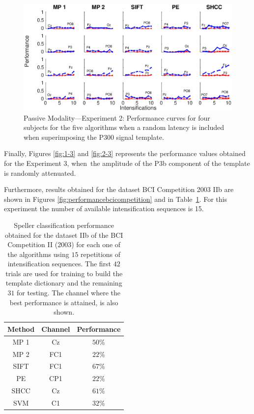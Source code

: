 \documentclass[brainsci,article,accept,moreauthors,pdftex,10pt,a4paper]{mdpi}
\begin{document}
\begin{figure}[H]
\centering
\includegraphics[width=16cm]{images/1-2.eps}
\caption{{Passive Modality---Experiment 2}: Performance curves for four subjects for the five algorithms when a random latency is included when superimposing the P300 signal template.}
\label{fig:1-2}
\end{figure}

Finally, Figures \ref{fig:1-3} and \ref{fig:2-3} represents the performance values obtained for the Experiment 3, when~the amplitude of the P3b component of the template is randomly attenuated. 



Furthermore, results obtained for the dataset BCI Competition 2003 IIb are shown in Figures \ref{fig:performancebcicompetition} and in Table~\ref{tab:bcicompetitionresults}.  For this experiment the number of available intensification sequences is 15.


 \vspace{-6pt}
\begin{table}[H]
\caption{Speller classification performance obtained for the dataset IIb of the BCI Competition II (2003) for each one of the algorithms using $15$ repetitions of intensification sequences. The first $42$ trials are used for training to build the template dictionary and the remaining $31$ for testing. The channel where the best performance is attained, is also shown. }
\centering
\begin{tabular}{ccc}
\toprule
\textbf{Method}	& \textbf{Channel} &  \textbf{Performance} \\
\midrule
MP 1 & Cz  & $50\%$ \\
MP 2 & FC1 & $22\%$ \\
SIFT  & FC1 & $67\%$ \\
PE     & CP1 & $22\%$ \\
SHCC & Cz & $61\%$ \\
SVM     & C1  & $32\%$ \\
\bottomrule
\end{tabular}
\label{tab:bcicompetitionresults}
\end{table}
\end{document}
